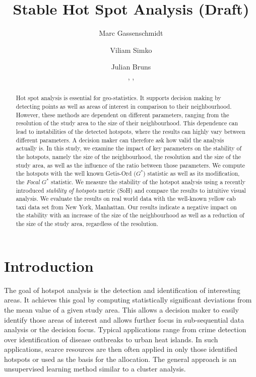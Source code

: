\documentclass{itatnew}
\begin{document}
\title{Stable Hot Spot Analysis (Draft)}

\author{
  Marc Gassenschmidt \and
  Viliam Simko  \and
  Julian Bruns
  \\
  ,
  ,
}

  
\maketitle              %



\begin{abstract}
Hot spot analysis is essential for geo-statistics.
It supports decision making by detecting points
as well as areas of interest in comparison to their
neighbourhood. However, these methods are dependent
on different parameters, ranging from the resolution
of the study area to the size of their neighbourhood.
This dependence can lead to instabilities of the detected
hotspots, where the results can highly vary between
different parameters. A decision maker can therefore ask
how valid the analysis actually is.
%
In this study, we examine the impact of key parameters
on the stability of the hotspots, namely the size of
the neighbourhood, the resolution and the size of the
study area, as well as the influence of the ratio between
those parameters.
%
We compute the hotspots with the well known Getis-Ord ($G^*$)
statistic as well as its modification, the \emph{Focal $G^*$} statistic.
We measure the stability of the hotspot analysis using
a recently introduced \emph{stability of hotspots} metric (SoH)
and compare the results to intuitive visual analysis.
%
We evaluate the results on real world data with the well-known
yellow cab taxi data set from New York, Manhattan.
Our results indicate a negative impact on the stability with
an increase of the size of the neighbourhood as well as
a reduction of the size of the study area, regardless of
the resolution.
\end{abstract}


\section{Introduction}
The goal of hotspot analysis is the detection and identification of interesting areas. It achieves this goal by computing statistically significant deviations from the mean value of a given study area. This allows a decision maker to easily identify those areas of interest and allows further focus in sub-sequential data analysis or the decision focus. Typical applications range from crime detection over identification of disease outbreaks to urban heat islands. In such applications, scarce resources are then often applied in only those identified hotspots or used as the basis for the allocation. The general approach is an unsupervised learning method similar to a cluster analysis. 
\end{document}
